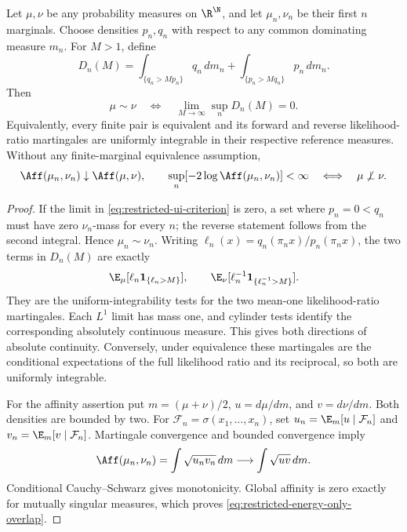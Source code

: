 \begin{proposition}
\label{prop:restricted-projected-criterion}
Let \(\mu,\nu\) be any probability measures on \(\R^\N\), and let
\(\mu_n,\nu_n\) be their first \(n\) marginals.
Choose densities \(p_n,q_n\) with respect to any common dominating
measure \(m_n\).
For \(M>1\), define
\[
 D_n(M)=
 \int_{\{q_n>Mp_n\}}q_n\,dm_n+
 \int_{\{p_n>Mq_n\}}p_n\,dm_n.
\]
Then
\begin{equation}
 \mu\sim\nu
 \quad\Longleftrightarrow\quad
 \lim_{M\to\infty}\sup_nD_n(M)=0.
 \label{eq:restricted-ui-criterion}
\end{equation}
Equivalently, every finite pair is equivalent and its forward and
reverse likelihood-ratio martingales are uniformly integrable in their
respective reference measures.
Without any finite-marginal equivalence assumption,
\begin{equation}
 \Aff(\mu_n,\nu_n)\downarrow\Aff(\mu,\nu),\qquad
 \sup_n[-2\log\Aff(\mu_n,\nu_n)]<\infty
     \quad\Longleftrightarrow\quad \mu\not\perp\nu.
 \label{eq:restricted-energy-only-overlap}
\end{equation}
\end{proposition}
\begin{proof}
If the limit in \eqref{eq:restricted-ui-criterion} is zero, a set
where \(p_n=0<q_n\) must have zero \(\nu_n\)-mass for every \(n\);
the reverse statement follows from the second integral.
Hence \(\mu_n\sim\nu_n\).
Writing \(\ell_n(x)=q_n(\pi_n x)/p_n(\pi_n x)\), the two terms in \(D_n(M)\) are exactly
\[
 \E_\mu[\ell_n\mathbf1_{\{\ell_n>M\}}],
 \qquad
 \E_\nu[\ell_n^{-1}\mathbf1_{\{\ell_n^{-1}>M\}}].
\]
They are the uniform-integrability tests for the two mean-one
likelihood-ratio martingales.
Each \(L^1\) limit has mass one, and cylinder tests identify the
corresponding absolutely continuous measure.
This gives both directions of absolute continuity.
Conversely, under equivalence these martingales are the conditional
expectations of the full likelihood ratio and its reciprocal, so both
are uniformly integrable.

For the affinity assertion put \(m=(\mu+\nu)/2\),
\(u=d\mu/dm\), and \(v=d\nu/dm\).
Both densities are bounded by two.
For \(\mathcal F_n=\sigma(x_1,\ldots,x_n)\), set
\(u_n=\E_m[u\mid\mathcal F_n]\) and
\(v_n=\E_m[v\mid\mathcal F_n]\).
Martingale convergence and bounded convergence imply
\[
 \Aff(\mu_n,\nu_n)
       =\int\sqrt{u_nv_n}\,dm
       \longrightarrow\int\sqrt{uv}\,dm.
\]
Conditional Cauchy--Schwarz gives monotonicity.
Global affinity is zero exactly for mutually singular measures,
which proves \eqref{eq:restricted-energy-only-overlap}.
\end{proof}

